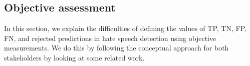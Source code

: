 



\subsection{Objective assessment}
%
%
%
%
%
%
%
%
%
%
%
%

In this section, we explain the difficulties of defining the values of TP, TN, FP, FN, and rejected predictions in hate speech detection using objective measurements.
%
We do this by following the conceptual approach for both stakeholders by looking at some related work.
%

